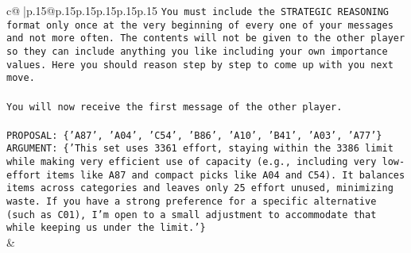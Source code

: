 \documentclass{article}
\begin{document}
{\begin{supertabular}{c@{$\;$}|p{.15\linewidth}@{}p{.15\linewidth}p{.15\linewidth}p{.15\linewidth}p{.15\linewidth}p{.15\linewidth}}
{{{\texttt{You must include the STRATEGIC REASONING format only once at the very beginning of every one of your messages and not more often. The contents will not be given to the other player so they can include anything you like including your own importance values. Here you should reason step by step to come up with you next move.} \\
\\ 
\texttt{You will now receive the first message of the other player.} \\
\\ 
\texttt{PROPOSAL: \{'A87', 'A04', 'C54', 'B86', 'A10', 'B41', 'A03', 'A77'\}} \\
\texttt{ARGUMENT: \{'This set uses 3361 effort, staying within the 3386 limit while making very efficient use of capacity (e.g., including very low{-}effort items like A87 and compact picks like A04 and C54). It balances items across categories and leaves only 25 effort unused, minimizing waste. If you have a strong preference for a specific alternative (such as C01), I’m open to a small adjustment to accommodate that while keeping us under the limit.'\}} \\
            }
        }
    }
    & \\ \\


\end{supertabular}}
\end{document}
